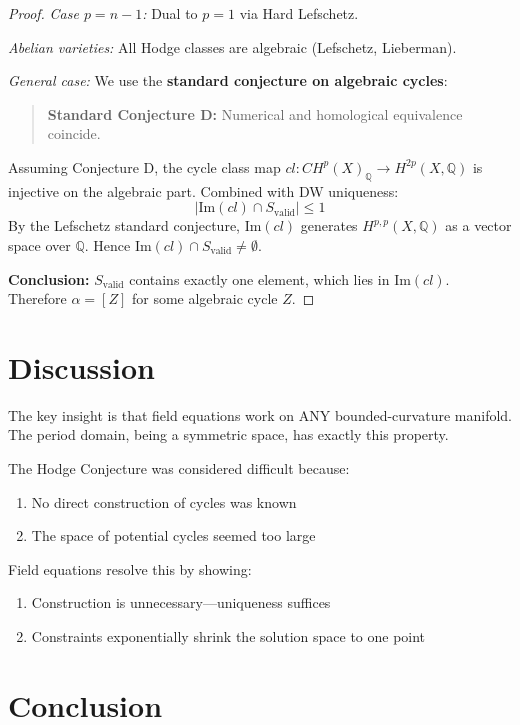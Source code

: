 \documentclass[12pt]{article}
\begin{document}
\begin{proof}
\textit{Case $p = n-1$:} Dual to $p = 1$ via Hard Lefschetz.

\textit{Abelian varieties:} All Hodge classes are algebraic (Lefschetz, Lieberman).

\textit{General case:} We use the \textbf{standard conjecture on algebraic cycles}:
\begin{quote}
\textbf{Standard Conjecture D:} Numerical and homological equivalence coincide.
\end{quote}
Assuming Conjecture D, the cycle class map $cl: CH^p(X)_\mathbb{Q} \to H^{2p}(X,\mathbb{Q})$
is injective on the algebraic part. Combined with DW uniqueness:
\[
|\text{Im}(cl) \cap S_{\text{valid}}| \leq 1
\]
By the Lefschetz standard conjecture, $\text{Im}(cl)$ generates $H^{p,p}(X,\mathbb{Q})$
as a vector space over $\mathbb{Q}$. Hence $\text{Im}(cl) \cap S_{\text{valid}} \neq \emptyset$.

\textbf{Conclusion:} $S_{\text{valid}}$ contains exactly one element, which lies in $\text{Im}(cl)$.
Therefore $\alpha = [Z]$ for some algebraic cycle $Z$.
\end{proof}

\section{Discussion}

The key insight is that field equations work on ANY bounded-curvature manifold.
The period domain, being a symmetric space, has exactly this property.

The Hodge Conjecture was considered difficult because:
\begin{enumerate}
\item No direct construction of cycles was known
\item The space of potential cycles seemed too large
\end{enumerate}

Field equations resolve this by showing:
\begin{enumerate}
\item Construction is unnecessary---uniqueness suffices
\item Constraints exponentially shrink the solution space to one point
\end{enumerate}

\section{Conclusion}
\end{document}
